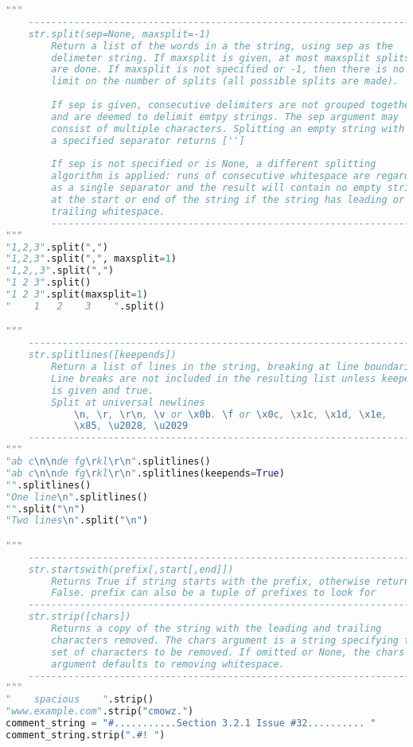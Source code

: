 \documentclass[a4paper,landscape]{report}
\begin{document}
\begin{lstlisting}[language=Python]
"""
    ---------------------------------------------------------------------
    str.split(sep=None, maxsplit=-1)
        Return a list of the words in a the string, using sep as the
        delimeter string. If maxsplit is given, at most maxsplit splits
        are done. If maxsplit is not specified or -1, then there is no
        limit on the number of splits (all possible splits are made).
        
        If sep is given, consecutive delimiters are not grouped together
        and are deemed to delimit emtpy strings. The sep argument may
        consist of multiple characters. Splitting an empty string with
        a specified separator returns ['']
        
        If sep is not specified or is None, a different splitting
        algorithm is applied: runs of consecutive whitespace are regarded
        as a single separator and the result will contain no empty strings
        at the start or end of the string if the string has leading or
        trailing whitespace.
        ---------------------------------------------------------------------
"""
"1,2,3".split(",")
"1,2,3".split(",", maxsplit=1)
"1,2,,3".split(",")
"1 2 3".split()
"1 2 3".split(maxsplit=1)
"    1   2    3    ".split()

"""
    ---------------------------------------------------------------------
    str.splitlines([keepends])
        Return a list of lines in the string, breaking at line boundaries.
        Line breaks are not included in the resulting list unless keepends
        is given and true.
        Split at universal newlines
            \n, \r, \r\n, \v or \x0b. \f or \x0c, \x1c, \x1d, \x1e,
            \x85, \u2028, \u2029
    ---------------------------------------------------------------------
"""
"ab c\n\nde fg\rkl\r\n".splitlines()
"ab c\n\nde fg\rkl\r\n".splitlines(keepends=True)
"".splitlines()
"One line\n".splitlines()
"".split("\n")
"Two lines\n".split("\n")

"""
    ---------------------------------------------------------------------
    str.startswith(prefix[,start[,end]])
        Returns True if string starts with the prefix, otherwise return 
        False. prefix can also be a tuple of prefixes to look for
    ---------------------------------------------------------------------
    str.strip([chars])
        Returns a copy of the string with the leading and trailing 
        characters removed. The chars argument is a string specifying the
        set of characters to be removed. If omitted or None, the chars 
        argument defaults to removing whitespace.
    ---------------------------------------------------------------------
"""
"    spacious    ".strip()
"www.example.com".strip("cmowz.")
comment_string = "#...........Section 3.2.1 Issue #32.......... "
comment_string.strip(".#! ")


\end{lstlisting}
\end{document}
